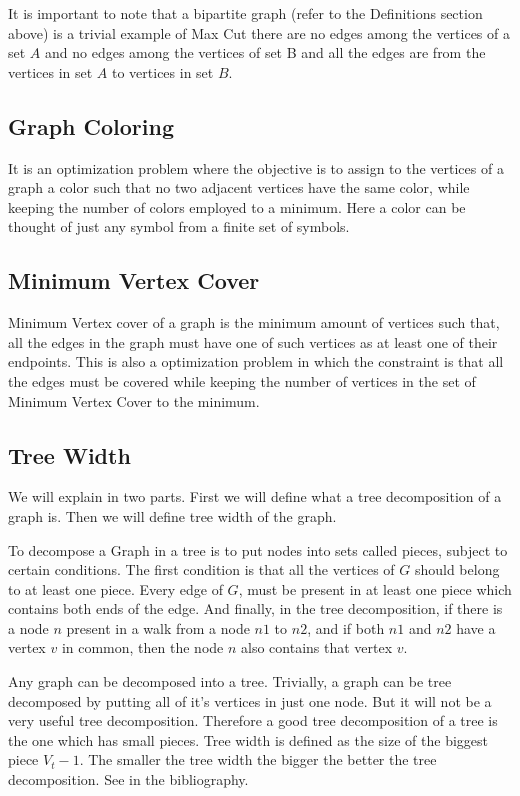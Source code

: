 It is important to note that a bipartite graph (refer to the Definitions
section above) is a trivial example of Max Cut there are no edges among the
vertices of a set $A$ and no edges among the vertices of set B and all the edges
are from the vertices in set $A$ to vertices in set $B$.

\subsection{Graph Coloring}
It is an optimization problem where the objective is to assign to the vertices
of a graph a color such that no two adjacent vertices have the same color,
while keeping the number of colors employed to a minimum. Here a color can be
thought of just any symbol from a finite set of symbols.

\subsection{Minimum Vertex Cover}
Minimum Vertex cover of a graph is the minimum amount of vertices such that,
all the edges in the graph must have one of such vertices as at least one of
their endpoints. This is also a optimization problem in which the constraint is
that all the edges must be covered while keeping the number of vertices in the
set of Minimum Vertex Cover to the minimum.

\subsection{Tree Width}
\label{explanation: treewidth}
We will explain in two parts. First we will define what a tree decomposition of
a graph is. Then we will define tree width of the graph.

To decompose a Graph in a tree is to put nodes into sets called pieces, subject
to certain conditions.  The first condition is that all the vertices of $G$
should belong to at least one piece. Every edge of $G$, must be present in
at least one piece which contains both ends of the edge.  And finally, in the
tree decomposition, if there is a node $n$ present in a walk from a node $n1$
to $n2$, and if both $n1$ and $n2$ have a vertex $v$ in common, then the node
$n$ also contains that vertex $v$. 

Any graph can be decomposed into a tree. Trivially, a graph can be tree
decomposed by putting all of it's vertices in just one node. But it will not be
a very useful tree decomposition.  Therefore a good tree decomposition of a
tree is the one which has small pieces.  Tree width is defined as the size of
the biggest piece $V_t - 1$. The smaller the tree width the bigger the better
the tree decomposition. See \cite{KleinbergTardos06} in the bibliography.

